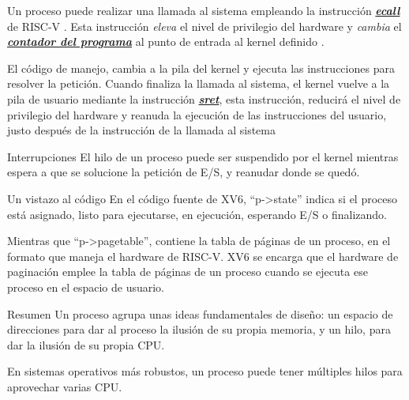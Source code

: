 \documentclass{libs/ufc_format}
\begin{document}
\begin{frame}{}
    Un proceso puede realizar una llamada al sistema empleando la instrucción \href{https://jborza.com/emulation/2021/04/22/ecalls-and-syscalls.html}{\textit{\textbf{ecall}}} de RISC-V \cite{xv6_book}. Esta instrucción \emph{eleva} el nivel de privilegio del hardware y \emph{cambia} el \href{https://en.wikipedia.org/wiki/Program_counter}{\textit{\textbf{contador del programa}}} al punto de entrada al kernel definido \cite{xv6_book}.

    \vspace{0.2cm}
    
    El código de manejo, cambia a la pila del kernel y ejecuta las instrucciones para resolver la petición. Cuando finaliza la llamada al sistema, el kernel vuelve a la pila de usuario mediante la instrucción \href{https://jborza.com/post/2021-04-04-riscv-supervisor-mode/}{\textit{\textbf{sret}}}, esta instrucción, reducirá el nivel de privilegio del hardware y reanuda la ejecución de las instrucciones del usuario, justo después de la instrucción de la llamada al sistema \cite{xv6_book}

    \begin{block}{Interrupciones}
        El hilo de un proceso puede ser suspendido por el kernel mientras espera a que se solucione la petición de E/S, y reanudar donde se quedó.
    \end{block}
\end{frame}
\begin{frame}{Un vistazo al código}
    En el código fuente de XV6, “p->state” indica si el proceso está asignado, listo para ejecutarse, en ejecución, esperando E/S o finalizando. \cite{xv6_book}

    \vspace{0.3cm}

    Mientras que “p->pagetable”, contiene la tabla de páginas de un proceso, en el formato que maneja el hardware de RISC-V. XV6 se encarga que el hardware de paginación emplee la tabla de páginas de un proceso cuando se ejecuta ese proceso en el espacio de usuario.  \cite{xv6_book}
\end{frame}
\begin{frame}{Resumen}
    Un proceso agrupa unas ideas fundamentales de diseño: un espacio de direcciones para dar al proceso la ilusión de su propia memoria, y un hilo, para dar la ilusión de su propia CPU. \cite{xv6_book}

    \vspace{0.3cm}

    En sistemas operativos más robustos, un proceso puede tener múltiples hilos para aprovechar varias CPU.
\end{frame}
\end{document}
